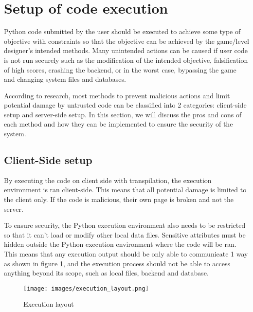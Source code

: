 \section{Setup of code execution}
Python code submitted by the user should be executed to achieve some type of objective with constraints so that the objective can be achieved by the game/level designer's intended methods. Many unintended actions can be caused if user code is not run securely such as the modification of the intended objective, falsification of high scores, crashing the backend, or in the worst case, bypassing the game and changing system files and databases.

According to research, most methods to prevent malicious actions and limit potential damage by untrusted code can be classified into 2 categories: client-side setup and server-side setup. In this section, we will discuss the pros and cons of each method and how they can be implemented to ensure the security of the system.

\subsection{Client-Side setup}
By executing the code on client side with transpilation, the execution environment is ran client-side. This means that all potential damage is limited to the client only. If the code is malicious, their own page is broken and not the server.

To ensure security, the Python execution environment also needs to be restricted so that it can't load or modify other local data files. Sensitive attributes must be hidden outside the Python execution environment where the code will be ran. This means that any execution output should be only able to communicate 1 way as shown in figure \ref{fig:execution layout}, and the execution process should not be able to access anything beyond its scope, such as local files, backend and database.

\begin{figure}[H]
    \centering
    \texttt{[image: images/execution\_layout.png]}
    \caption{Execution layout}
    \label{fig:execution layout}
\end{figure}


